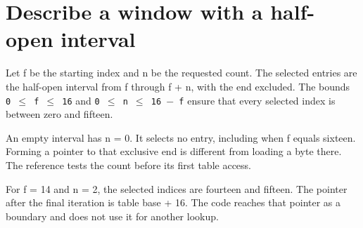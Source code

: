 \section{Describe a window with a half-open
  interval}\label{005-seven-segment-counter-p04-describe-a-window-with-a-half-open-interval}

Let f be the starting index and n be the requested count. The selected
entries are the half-open interval from f through f + n, with the end
excluded. The bounds \texttt{0\ \ensuremath{\leq}\ f\ \ensuremath{\leq}\ 16} and
\texttt{0\ \ensuremath{\leq}\ n\ \ensuremath{\leq}\ 16\ \ensuremath{-}\ f} ensure that every selected index is
between zero and fifteen.

An empty interval has n = 0. It selects no entry, including when f
equals sixteen. Forming a pointer to that exclusive end is different
from loading a byte there. The reference tests the count before its
first table access.

For f = 14 and n = 2, the selected indices are fourteen and fifteen. The
pointer after the final iteration is table base + 16. The code reaches
that pointer as a boundary and does not use it for another lookup.
